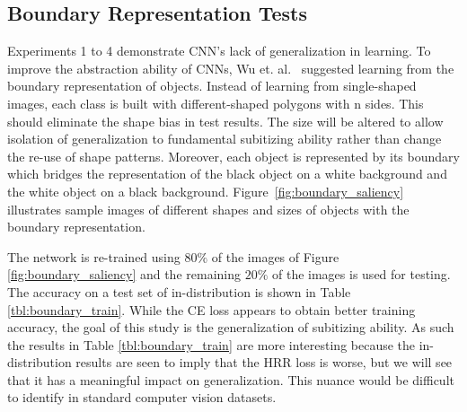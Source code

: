 \documentclass[letterpaper]{article} %
\begin{document}
\subsection{Boundary Representation Tests}
Experiments 1 to 4 demonstrate CNN’s lack of generalization in learning. To improve the abstraction ability of CNNs, Wu et. al.~\cite{b1} suggested learning from the boundary representation of objects. Instead of learning from single-shaped images, each class is built with different-shaped polygons with n sides. This should eliminate the shape bias in test results. The size will be altered to allow isolation of generalization to fundamental subitizing ability rather than change the re-use of shape patterns. Moreover, each object is represented by its boundary which bridges the representation of the black object on a white background and the white object on a black background. Figure~\ref{fig:boundary_saliency} illustrates sample images of different shapes and sizes of objects with the boundary representation.
\par
The network is re-trained using $80\%$ of the images of Figure \ref{fig:boundary_saliency} and the remaining $20\%$ of the images is used for testing. The accuracy on a test set of in-distribution is shown in Table \ref{tbl:boundary_train}. While the CE loss appears to obtain better training accuracy, the goal of this study is the generalization of subitizing ability. As such the results in Table \ref{tbl:boundary_train} are more interesting because the in-distribution results are seen to imply that the HRR loss is worse, but we will see that it has a meaningful impact on generalization. This nuance would be difficult to identify in standard computer vision datasets.
\end{document}
